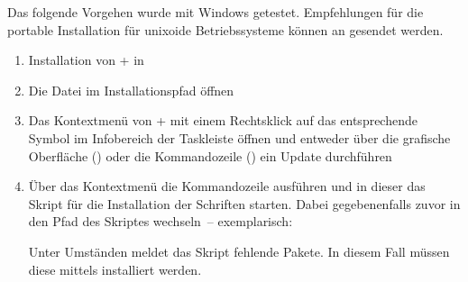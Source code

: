 \minisec{\TeXLive+}

Das folgende Vorgehen wurde mit Windows getestet. Empfehlungen für die portable 
Installation für unixoide Betriebssysteme können an \mailto{\TUDScriptContact} 
gesendet werden.
%
\begin{enumerate}
\item Installation von \TeXLive+ in 
\item Die Datei  im Installationspfad öffnen
\item Das Kontextmenü von \TeXLive+ mit einem Rechtsklick auf das entsprechende 
  Symbol im Infobereich der Taskleiste öffnen und entweder über die grafische 
  Oberfläche () oder die Kommandozeile 
  () ein Update durchführen
\item Über das Kontextmenü die Kommandozeile ausführen und in dieser das Skript 
  für die Installation der Schriften  starten. 
  Dabei gegebenenfalls zuvor in den Pfad des Skriptes wechseln~-- exemplarisch:
  \begin{quoting}
  \RET*%
  \RET%
  \end{quoting}
  Unter Umständen meldet das Skript fehlende Pakete. In diesem Fall müssen 
  diese mittels  installiert werden.
\end{enumerate}


\minisec{\MiKTeX+}

